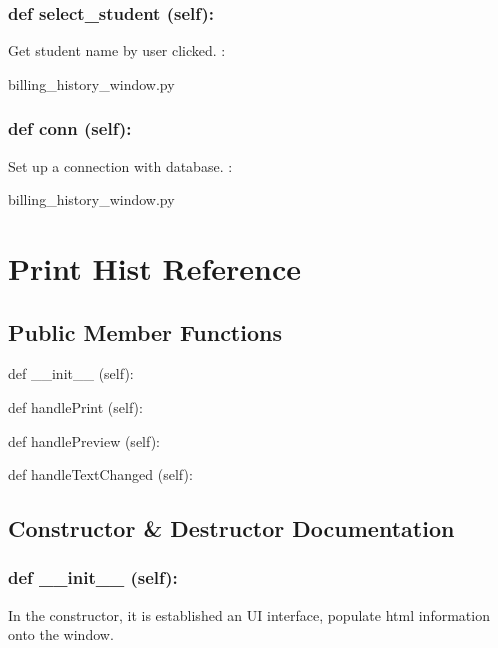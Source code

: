 \hypertarget{class_poly_a14a7ad77ce612b0c54f531d307ee4b39}{
\subsubsection[{def select_student (self):}]{\setlength{\rightskip}{0pt plus 5cm}def {select\_student} (self):}}\label{class_poly_a14a7ad77ce612b0c54f531d307ee4b39}
Get student name by user clicked.
:\begin{DoxyCompactItemize}
\item 
billing\_history\_window.\-py\end{DoxyCompactItemize}

\hypertarget{class_poly_a14a7ad77ce612b0c54f531d307ee4b39}{
\subsubsection[{def conn (self):}]{\setlength{\rightskip}{0pt plus 5cm}def {conn} (self):}}\label{class_poly_a14a7ad77ce612b0c54f531d307ee4b39}
Set up a connection with database.
:\begin{DoxyCompactItemize}
\item 
billing\_history\_window.\-py\end{DoxyCompactItemize}

\hypertarget{Print_Hist}{\section{Print Hist Reference}
\label{Print_Hist}
}
\subsection*{Public Member Functions}
\begin{DoxyCompactItemize}
\item 
def {\_\_init\_\_} (self):
\item 
def {handlePrint} (self):
\item 
def {handlePreview} (self):
\item 
def {handleTextChanged} (self):

\end{DoxyCompactItemize}

\subsection{Constructor \& Destructor Documentation}
\hypertarget{class_poly_aa3def076b74bed67904976ad4f9fe9b1}{
\subsubsection[{def __init__ (self):}]{\setlength{\rightskip}{0pt plus 5cm}def {\_\_init\_\_} (self): 
}}
In the constructor, it is established an UI interface, populate html information onto the window. 

